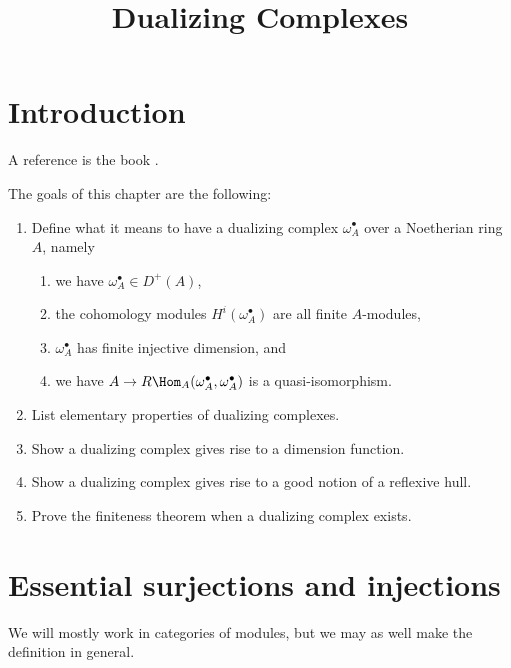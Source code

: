 

%


\title{Dualizing Complexes}


\maketitle

\label{section-phantom}

\tableofcontents

\section{Introduction}
\label{section-introduction}

\noindent
A reference is the book \cite{R+D}.

\medskip\noindent
The goals of this chapter are the following:
\begin{enumerate}
\item Define what it means to have a dualizing complex $\omega_A^\bullet$
over a Noetherian ring $A$, namely
\begin{enumerate}
\item we have $\omega_A^\bullet \in D^{+}(A)$,
\item the cohomology modules $H^i(\omega_A^\bullet)$ are
all finite $A$-modules,
\item $\omega_A^\bullet$ has finite injective dimension, and
\item we have $A \to R\Hom_A(\omega_A^\bullet, \omega_A^\bullet)$
is a quasi-isomorphism.
\end{enumerate}
\item List elementary properties of dualizing complexes.
\item Show a dualizing complex gives rise to a dimension function.
\item Show a dualizing complex gives rise to a good notion of a
reflexive hull.
\item Prove the finiteness theorem when a dualizing complex exists.
\end{enumerate}






\section{Essential surjections and injections}
\label{section-essential}

\noindent
We will mostly work in categories of modules, but we may as well make
the definition in general.

